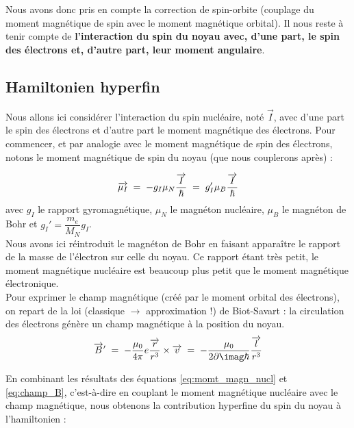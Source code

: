 Nous avons donc pris en compte la correction de spin-orbite (couplage du moment magnétique de spin avec le moment magnétique orbital). Il nous reste à tenir compte de \textbf{l’interaction du spin du noyau avec, d'une part, le spin des électrons et, d'autre part, leur moment angulaire}. 



    \subsection{Hamiltonien hyperfin}
    
    

Nous allons ici considérer l'interaction du spin nucléaire, noté $\overrightarrow{I}$, avec d'une part le spin des électrons et d'autre part le moment magnétique des électrons. Pour commencer, et par analogie avec le moment magnétique de spin des électrons, notons le moment magnétique de spin du noyau (que nous couplerons après) :

\begin{equation}
    \overrightarrow{\mu_I}
    \; = \; -g_I\mu_N\dfrac{\overrightarrow{I}}{\hbar}
    \; = \;  g_I'\mu_B\dfrac{\overrightarrow{I}}{\hbar}
    \label{eq:momt_magn_nucl}
\end{equation}
avec $g_I$ le rapport gyromagnétique, $\mu_N$ le magnéton nucléaire, $\mu_B$ le magnéton de Bohr et $g_I'=\dfrac{m_e}{M_N}g_I$.\\
Nous avons ici réintroduit le magnéton de Bohr en faisant apparaître le rapport de la masse de l’électron sur celle du noyau. Ce rapport étant très petit, le moment magnétique nucléaire est beaucoup plus petit que le moment magnétique électronique.\\

Pour exprimer le champ magnétique (créé par le moment orbital des électrons), on repart de la loi (classique $\rightarrow$ approximation !) de Biot-Savart : la circulation des électrons génère un champ magnétique à la position du noyau.
\begin{equation}
    \overrightarrow{B}' \eq
    -\dfrac{\mu_0}{4\pi}e\dfrac{\overrightarrow{r}}{r^3}\times \overrightarrow{v} \eq
    -\dfrac{\mu_0}{2\p\imag\hbar}\dfrac{\overrightarrow{l}}{r^3}
    \label{eq:champ_B}
\end{equation}

En combinant les résultats des équations \eqref{eq:momt_magn_nucl} et \eqref{eq:champ_B}, c'est-à-dire en couplant le moment magnétique nucléaire avec le champ magnétique, nous obtenons la contribution hyperfine du spin du noyau à l'hamiltonien :

